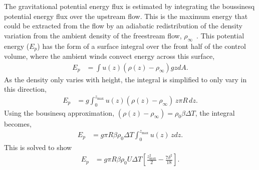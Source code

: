 The gravitational potential energy flux is estimated by integrating the
boussinesq potential energy flux over the upstream flow. 
This is the maximum energy that could be extracted from the flow by an 
adiabatic redistribution of the density variation from the ambient 
density of the freestream flow,
$\rho_\infty$~\cite{hatsopoulos1965principles}. This potential energy  
($E_p$) has the form of a surface integral over the front half of the
control volume, where the ambient winds convect energy across this surface,
\begin{align*}
  E_p & = \int u(z) (\rho(z)-\rho_\infty) g z dA. 
\end{align*}
As the density only varies with height, the integral is simplified to
only vary in this direction,
\begin{align*}
  E_p  & = g \int^{z_\text{max}}_0 u(z) (\rho(z)-\rho_\infty) \, z  \pi
 R \, dz.
\end{align*}
Using the bousinesq approximation, $(\rho(z)-\rho_\infty)  = \rho_0 \beta \Delta T$,
the integral becomes, 
\begin{align*}
  E_p & = g  \pi R \beta \rho_0 \Delta T \int^{z_\text{max}}_0 u(z) \, z dz.
\end{align*}
This is solved to show
\begin{align*}
  E_p & = g  \pi R \beta \rho_0 U \Delta T \left[ \frac{z_\text{max}^2}{2} - \frac{7 \delta^2}{18} \right].
\end{align*}

%
% 
%
%
%


